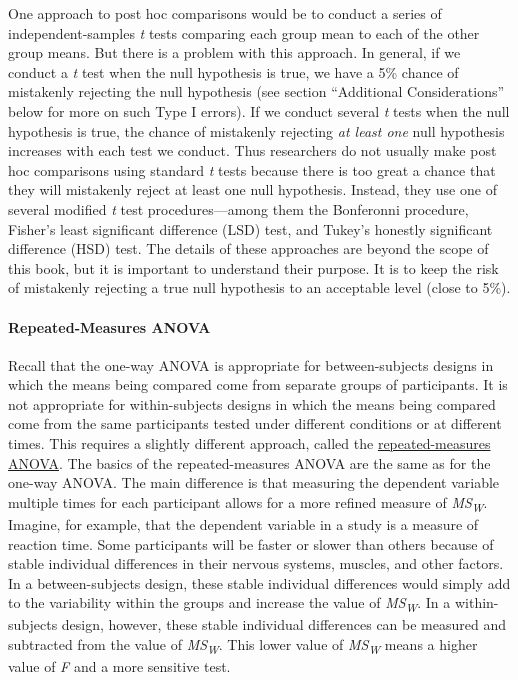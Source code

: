 \documentclass[
]{krantz}
\begin{document}
One approach to post hoc comparisons would be to conduct a series of independent-samples \emph{t} tests comparing each group mean to each of the other group means. But there is a problem with this approach. In general, if we conduct a \emph{t} test when the null hypothesis is true, we have a 5\% chance of mistakenly rejecting the null hypothesis (see section ``Additional Considerations'' below for more on such Type I errors). If we conduct several \emph{t} tests when the null hypothesis is true, the chance of mistakenly rejecting \emph{at least one} null hypothesis increases with each test we conduct. Thus researchers do not usually make post hoc comparisons using standard \emph{t} tests because there is too great a chance that they will mistakenly reject at least one null hypothesis. Instead, they use one of several modified \emph{t} test procedures---among them the Bonferonni procedure, Fisher's least significant difference (LSD) test, and Tukey's honestly significant difference (HSD) test. The details of these approaches are beyond the scope of this book, but it is important to understand their purpose. It is to keep the risk of mistakenly rejecting a true null hypothesis to an acceptable level (close to 5\%).

\paragraph*{Repeated-Measures ANOVA}\label{repeated-measures-anova}

Recall that the one-way ANOVA is appropriate for between-subjects designs in which the means being compared come from separate groups of participants. It is not appropriate for within-subjects designs in which the means being compared come from the same participants tested under different conditions or at different times. This requires a slightly different approach, called the \hyperref[repeated-measures-anova]{repeated-measures ANOVA}. The basics of the repeated-measures ANOVA are the same as for the one-way ANOVA. The main difference is that measuring the dependent variable multiple times for each participant allows for a more refined measure of \emph{MS\textsubscript{W}}. Imagine, for example, that the dependent variable in a study is a measure of reaction time. Some participants will be faster or slower than others because of stable individual differences in their nervous systems, muscles, and other factors. In a between-subjects design, these stable individual differences would simply add to the variability within the groups and increase the value of \emph{MS\textsubscript{W}}. In a within-subjects design, however, these stable individual differences can be measured and subtracted from the value of \emph{MS\textsubscript{W}}. This lower value of \emph{MS\textsubscript{W}} means a higher value of \emph{F} and a more sensitive test.
\end{document}
